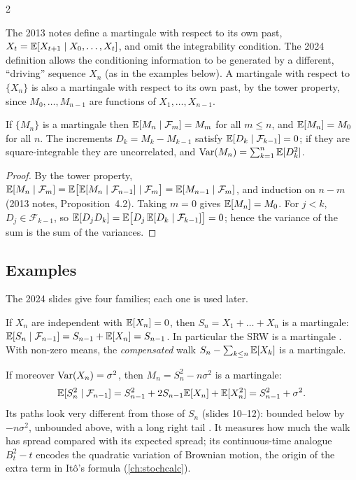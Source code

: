 \begin{paracol}{2}
\begin{coursenote}
The 2013 notes define a martingale with respect to its own past, $X_t=\mathbb{E}[X_{t+1}\mid X_0,\dots,X_t]$, and
omit the integrability condition. The 2024 definition allows the conditioning information to be generated
by a different, ``driving'' sequence $X_n$ (as in the examples below). A martingale with respect to
$\{X_n\}$ is also a martingale with respect to its own past, by the tower property, since
$M_0,\dots,M_{n-1}$ are functions of $X_1,\dots,X_{n-1}$.
\end{coursenote}

\begin{proposition}\label{ch04:prop-mart}
If $\{M_n\}$ is a martingale then $\mathbb{E}[M_n\mid\mathcal F_m]=M_m$ for all $m\le n$, and $\mathbb{E}[M_n]=M_0$ for all
$n$. The increments $D_k=M_k-M_{k-1}$ satisfy $\mathbb{E}[D_k\mid\mathcal F_{k-1}]=0$; if they are square-integrable
they are uncorrelated, and $\operatorname{Var}(M_n)=\sum_{k=1}^n\mathbb{E}[D_k^2]$.
\end{proposition}
\begin{proof}
By the tower property, $\mathbb{E}[M_n\mid\mathcal F_m]=\mathbb{E}\bigl[\mathbb{E}[M_n\mid\mathcal F_{n-1}]\mid\mathcal F_m\bigr]
=\mathbb{E}[M_{n-1}\mid\mathcal F_m]$, and induction on $n-m$ (2013 notes, Proposition~4.2). Taking $m=0$ gives
$\mathbb{E}[M_n]=M_0$. For $j<k$, $D_j\in\mathcal F_{k-1}$, so
$\mathbb{E}[D_jD_k]=\mathbb{E}\bigl[D_j\,\mathbb{E}[D_k\mid\mathcal F_{k-1}]\bigr]=0$; hence the variance of the sum is the sum of
the variances.
\end{proof}

\subsection{Examples}\label{ch04:sec-mart-ex}
The 2024 slides give four families; each one is used later.

\begin{example}\label{ch04:ex-m1}
If $X_n$ are independent with $\mathbb{E}[X_n]=0$, then $S_n=X_1+\dots+X_n$ is a martingale:
$\mathbb{E}[S_n\mid\mathcal F_{n-1}]=S_{n-1}+\mathbb{E}[X_n]=S_{n-1}$. In particular the SRW is a martingale
. With non-zero means, the \emph{compensated} walk $S_n-\sum_{k\le n}\mathbb{E}[X_k]$ is a
martingale.
\end{example}

\begin{example}\label{ch04:ex-m2}
If moreover $\operatorname{Var}(X_n)=\sigma^2$, then $M_n=S_n^2-n\sigma^2$ is a martingale:
\[
  \mathbb{E}[S_n^2\mid\mathcal F_{n-1}]=S_{n-1}^2+2S_{n-1}\mathbb{E}[X_n]+\mathbb{E}[X_n^2]=S_{n-1}^2+\sigma^2 .
\]
Its paths look very different from those of $S_n$ (slides 10--12): bounded below by $-n\sigma^2$, unbounded
above, with a long right tail . It measures how much the walk has spread compared with its
expected spread; its continuous-time analogue $B_t^2-t$ encodes the quadratic variation of Brownian
motion, the origin of the extra term in It\^o's formula (\cref{ch:stochcalc}).
\end{example}


\end{paracol}
